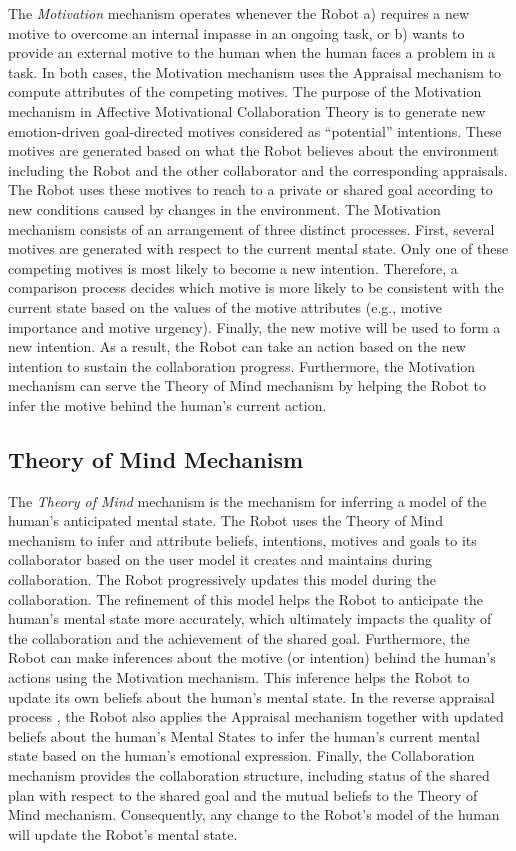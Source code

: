The \textit{Motivation} mechanism operates whenever the Robot a) requires a new
motive to overcome an internal impasse in an ongoing task, or b) wants to
provide an external motive to the human when the human faces a problem in a
task. In both cases, the Motivation mechanism uses the Appraisal mechanism to
compute attributes of the competing motives. The purpose of the Motivation
mechanism in Affective Motivational Collaboration Theory is to generate new
emotion-driven goal-directed motives considered as ``potential'' intentions.
These motives are generated based on what the Robot believes about the
environment including the Robot and the other collaborator and the corresponding
appraisals. The Robot uses these motives to reach to a private or shared goal
according to new conditions caused by changes in the environment. The Motivation
mechanism consists of an arrangement of three distinct processes. First, several
motives are generated with respect to the current mental state. Only one of
these competing motives is most likely to become a new intention. Therefore, a
comparison process decides which motive is more likely to be consistent with the
current state based on the values of the motive attributes (e.g., motive
importance and motive urgency). Finally, the new motive will be used to form a
new intention. As a result, the Robot can take an action based on the new
intention to sustain the collaboration progress. Furthermore, the Motivation
mechanism can serve the Theory of Mind mechanism by helping the Robot to infer
the motive behind the human's current action.

\subsection{Theory of Mind Mechanism}
\label{sec:tom-mech}

The \textit{Theory of Mind} mechanism is the mechanism for inferring a model of
the human's anticipated mental state. The Robot uses the Theory of Mind
mechanism to infer and attribute beliefs, intentions, motives and goals to its
collaborator based on the user model it creates and maintains during
collaboration. The Robot progressively updates this model during the
collaboration. The refinement of this model helps the Robot to anticipate the
human's mental state more accurately, which ultimately impacts the quality of
the collaboration and the achievement of the shared goal. Furthermore, the Robot
can make inferences about the motive (or intention) behind the human's actions
using the Motivation mechanism. This inference helps the Robot to update its own
beliefs about the human's mental state. In the reverse appraisal process
\cite{gratch:reverse-appraisal}, the Robot also applies the Appraisal mechanism
together with updated beliefs about the human's Mental States to infer the
human's current mental state based on the human's emotional expression. Finally,
the Collaboration mechanism provides the collaboration structure, including
status of the shared plan with respect to the shared goal and the mutual beliefs
to the Theory of Mind mechanism. Consequently, any change to the Robot's model
of the human will update the Robot's mental state.

